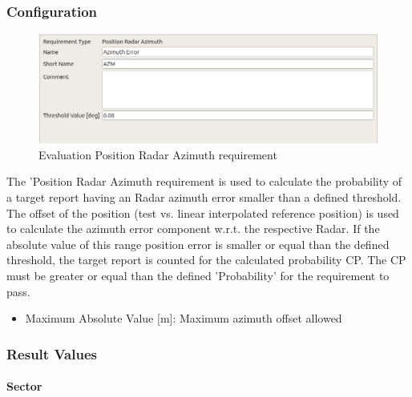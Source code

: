\subsubsection{Configuration}

\begin{figure}[H]
    \includegraphics[width=14cm,frame]{figures/eval_req_pos_radar_azm.png}
  \caption{Evaluation Position Radar Azimuth requirement}
\end{figure}

The ’Position Radar Azimuth requirement is used to calculate the probability of a target report
having an Radar azimuth error smaller than a defined threshold. The offset of the position
(test vs. linear interpolated reference position) is used to calculate the azimuth error component
w.r.t. the respective Radar. If the absolute value of this range
position error is smaller or equal than the defined threshold, the target report is counted
for the calculated probability CP. The CP must be greater or equal than the
defined ’Probability’ for the requirement to pass.
\ \\

\begin{itemize}  
\item Maximum Absolute Value [m]: Maximum azimuth offset allowed 
\end{itemize}

\subsubsection{Result Values}

\paragraph{Sector}

